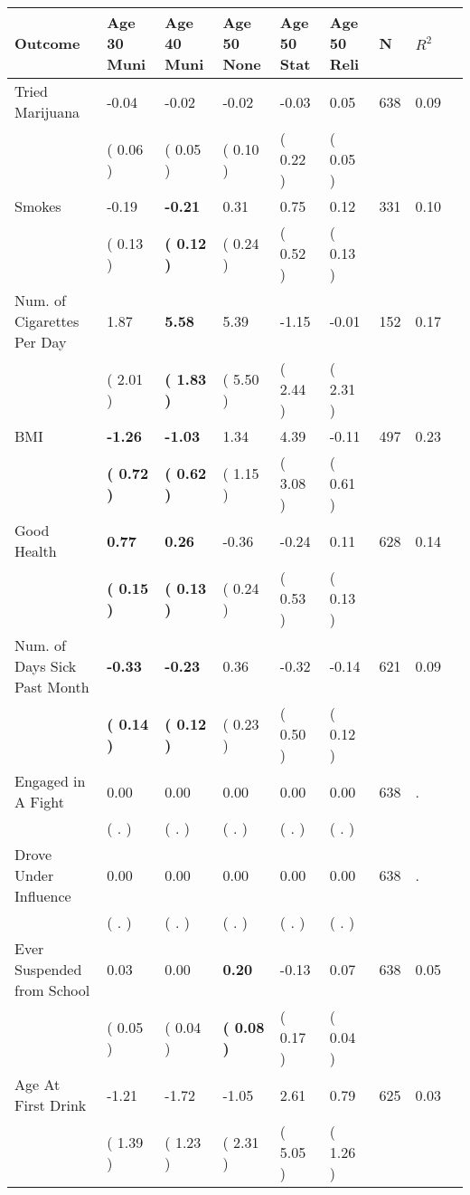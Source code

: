 \begin{tabular}{L{6.2cm} C{1.8cm} C{1.8cm} C{1.8cm} C{1.8cm} C{1.8cm} C{1.8cm} C{0.3cm} C{0.3cm}}
\toprule
 \textbf{Outcome} & \textbf{Age 30 Muni} & \textbf{Age 40 Muni} & \textbf{Age 50 None} & \textbf{Age 50 Stat} & \textbf{Age 50 Reli} & \textbf{N} & \textbf{$ R^2$} \\
\midrule
Tried Marijuana &     -0.04 &     -0.02 &     -0.02 &     -0.03 &      0.05  & 638 &       0.09 \\ 
 & (     0.06 ) & (     0.05 ) & (     0.10 ) & (     0.22 ) & (     0.05 )  & \\
Smokes &     -0.19 & \textbf{    -0.21} &      0.31 &      0.75 &      0.12  & 331 &       0.10 \\ 
 & (     0.13 ) & \textbf{(     0.12 )} & (     0.24 ) & (     0.52 ) & (     0.13 )  & \\
Num. of Cigarettes Per Day &      1.87 & \textbf{     5.58} &      5.39 &     -1.15 &     -0.01  & 152 &       0.17 \\ 
 & (     2.01 ) & \textbf{(     1.83 )} & (     5.50 ) & (     2.44 ) & (     2.31 )  & \\
BMI & \textbf{    -1.26} & \textbf{    -1.03} &      1.34 &      4.39 &     -0.11  & 497 &       0.23 \\ 
 & \textbf{(     0.72 )} & \textbf{(     0.62 )} & (     1.15 ) & (     3.08 ) & (     0.61 )  & \\
Good Health & \textbf{     0.77} & \textbf{     0.26} &     -0.36 &     -0.24 &      0.11  & 628 &       0.14 \\ 
 & \textbf{(     0.15 )} & \textbf{(     0.13 )} & (     0.24 ) & (     0.53 ) & (     0.13 )  & \\
Num. of Days Sick Past Month & \textbf{    -0.33} & \textbf{    -0.23} &      0.36 &     -0.32 &     -0.14  & 621 &       0.09 \\ 
 & \textbf{(     0.14 )} & \textbf{(     0.12 )} & (     0.23 ) & (     0.50 ) & (     0.12 )  & \\
Engaged in A Fight &      0.00 &      0.00 &      0.00 &      0.00 &      0.00  & 638 &          . \\ 
 & (        . ) & (        . ) & (        . ) & (        . ) & (        . )  & \\
Drove Under Influence &      0.00 &      0.00 &      0.00 &      0.00 &      0.00  & 638 &          . \\ 
 & (        . ) & (        . ) & (        . ) & (        . ) & (        . )  & \\
Ever Suspended from School &      0.03 &      0.00 & \textbf{     0.20} &     -0.13 &      0.07  & 638 &       0.05 \\ 
 & (     0.05 ) & (     0.04 ) & \textbf{(     0.08 )} & (     0.17 ) & (     0.04 )  & \\
Age At First Drink &     -1.21 &     -1.72 &     -1.05 &      2.61 &      0.79  & 625 &       0.03 \\ 
 & (     1.39 ) & (     1.23 ) & (     2.31 ) & (     5.05 ) & (     1.26 )  & \\
\bottomrule
\end{tabular}
